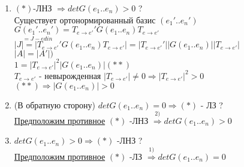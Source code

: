 \begin{enumerate}
 \item $(*)$-ЛНЗ $\Rightarrow detG(e_1..e_n)>0$ ? \\
       Существует ортонормированный базис $(e_1'..e_n')$ \\
       $\underset {=J-edin} {G(e_1'..e_n')} = T_{e \to e'}'G(e_1..e_n)T_{e \to e'}$ \\
       $\left| J \right| = \left| T_{e \to e'}'G(e_1..e_n)T_{e \to e'} \right| = \left| T_{e \to e'}' \right| \left| G(e_1..e_n) \right| \left| T_{e \to e'} \right| $ \\
       $\left| A \right| = \left| A' \right|)$ \\
       $1=\left| T_{e \to e'} \right|^2 \left| G(e_1..e_n) \right| (**)$ \\
       $T_{e \to e'}$ - невырожденная $\left| T_{e \to e'} \right| \ne 0 \Rightarrow \left| T_{e \to e'} \right|^2 > 0$\\
       $(**)\Rightarrow \left| G(e_1..e_n) \right| > 0$
 \item (В обратную сторону) $detG(e_1..e_n)=0 \Rightarrow (*)$ - ЛЗ ? \\
       \underline{Предположим противное} $(*)$ -ЛНЗ $\stackrel{2)}{\Rightarrow} detG(e_1..e_n)>0$
 \item $detG(e_1..e_n)>0 \Rightarrow (*)$ -ЛНЗ ? \\
       \underline{Предположим противное} $(*)$ -ЛЗ $\stackrel{1)}{\Rightarrow} detG(e_1..e_n)=0$
\end{enumerate}





        

